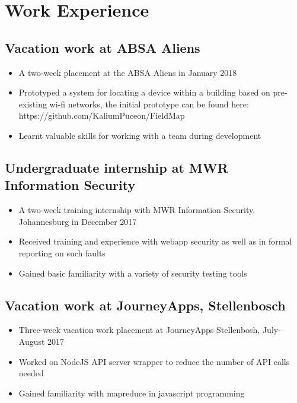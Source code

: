 \documentclass[12pt,a4paper,notitlepage]{article}
\begin{document}
\section*{Work Experience}

\subsection*{Vacation work at ABSA Aliens}
\begin{itemize}
    \item A two-week placement at the ABSA Aliens in January 2018
    \item Prototyped a system for locating a device within a building based on pre-existing wi-fi networks, the initial prototype can be found here:\\https://github.com/KaliumPuceon/FieldMap
    \item Learnt valuable skills for working with a team during development
\end{itemize}

\subsection*{Undergraduate internship at MWR Information Security}
\begin{itemize}
    \item A two-week training internship with MWR Information Security, Johannesburg in December 2017
    \item Received training and experience with webapp security as well as in formal reporting on such faults
    \item Gained basic familiarity with a variety of security testing tools
\end{itemize}

\subsection*{Vacation work at JourneyApps, Stellenbosch}
\begin{itemize}
    \item Three-week vacation work placement at JourneyApps Stellenbosh, July-August 2017
    \item Worked on NodeJS API server wrapper to reduce the number of API calls needed
    \item Gained familiarity with mapreduce in javascript programming
\end{itemize}
\end{document}
